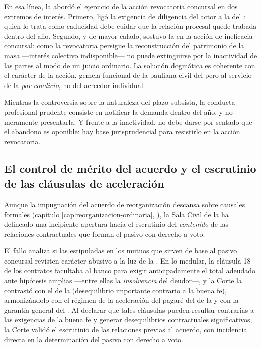 En esa línea, la 
\parencite{juris-ca-pm-16-2017} abordó el ejercicio de la acción revocatoria concursal en dos
extremos de interés. Primero, ligó la exigencia de diligencia del actor a la  del : quien lo trata como caducidad debe cuidar que la relación procesal
quede trabada dentro del año. Segundo, y de mayor calado, sostuvo la  en la acción de ineficacia concursal: como la revocatoria persigue la
reconstrucción del patrimonio de la masa ---interés colectivo indisponible--- no puede
extinguirse por la inactividad de las partes al modo de un juicio ordinario. La solución dogmática
es coherente con el carácter de la acción, gemela funcional de la pauliana civil del
 pero al servicio de la \emph{par condicio}, no del acreedor individual.

\begin{alerta}
Mientras la controversia sobre la naturaleza del plazo subsista, la conducta profesional prudente
consiste en notificar la demanda dentro del año, y no meramente presentarla. Y frente a la
inactividad, no debe darse por sentado que el abandono es oponible: hay base jurisprudencial para
resistirlo en la acción revocatoria.
\end{alerta}

\subsection{El control de mérito del acuerdo y el escrutinio de las cláusulas de aceleración}

Aunque la impugnación del acuerdo de reorganización descansa sobre causales formales
(capítulo \ref{cap:reorganizacion-ordinaria}, ), la Sala Civil de la \csup{} ha
delineado una incipiente apertura hacia el escrutinio del \emph{contenido} de las relaciones
contractuales que forman el pasivo con derecho a voto.

El fallo 
\parencite{juris-cs-34713-2023-santander} analiza si las 
estipuladas en los mutuos que sirven de base al pasivo concursal revisten carácter abusivo a
la luz de la . En lo
medular, la cláusula 18 de los contratos facultaba al banco para exigir anticipadamente el total
adeudado ante hipótesis amplias ---entre ellas la \emph{insolvencia} del deudor---, y la Corte
la contrastó con el  de la  (desequilibrio
importante contrario a la buena fe), armonizándolo con el régimen de la aceleración del pagaré
del  de la  y con la garantía general del
. Al declarar que tales cláusulas pueden resultar contrarias a las exigencias de la
buena fe y generar desequilibrios contractuales significativos, la Corte validó el escrutinio de
las relaciones previas al acuerdo, con incidencia directa en la determinación del pasivo con
derecho a voto.


